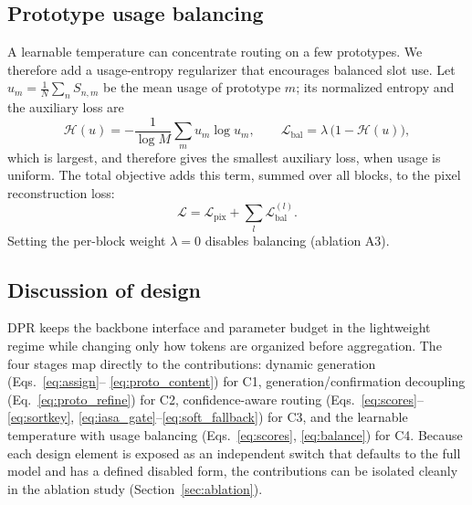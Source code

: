 \subsection{Prototype usage balancing}
\label{sec:method_balance}
A learnable temperature can concentrate routing on a few prototypes. We therefore
add a usage-entropy regularizer that encourages balanced slot use. Let
$u_m=\frac{1}{N}\sum_n S_{n,m}$ be the mean usage of prototype $m$;
its normalized entropy and the auxiliary loss are
\begin{equation}
\mathcal{H}(u) = -\frac{1}{\log M}\sum_{m} u_m\log u_m,
\qquad
\mathcal{L}_{\mathrm{bal}} = \lambda\,\big(1 - \mathcal{H}(u)\big),
\label{eq:balance}
\end{equation}
which is largest, and therefore gives the smallest auxiliary loss, when usage is
uniform. The total objective adds this term, summed over all blocks, to the pixel
reconstruction loss:
\begin{equation}
\mathcal{L} = \mathcal{L}_{\mathrm{pix}} + \sum_{l}\mathcal{L}^{(l)}_{\mathrm{bal}}.
\end{equation}
Setting the per-block weight $\lambda{=}0$ disables balancing (ablation A3).

\subsection{Discussion of design}
\label{sec:method_design}
DPR keeps the backbone interface and parameter budget in the lightweight regime
while changing only how tokens are organized before aggregation. The four stages map
directly to the contributions: dynamic generation (Eqs.~\eqref{eq:assign}--%
\eqref{eq:proto_content}) for C1, generation/confirmation decoupling
(Eq.~\eqref{eq:proto_refine}) for C2, confidence-aware routing
(Eqs.~\eqref{eq:scores}--\eqref{eq:sortkey}, \eqref{eq:iasa_gate}--\eqref{eq:soft_fallback})
for C3, and the learnable temperature with usage balancing (Eqs.~\eqref{eq:scores},
\eqref{eq:balance}) for C4. Because each design element is exposed as an independent
switch that defaults to the full model and has a defined disabled form, the
contributions can be isolated cleanly in the ablation study
(Section~\ref{sec:ablation}).

